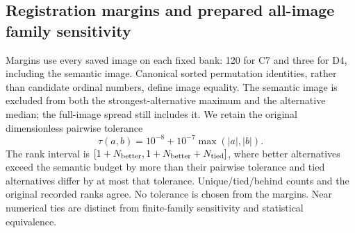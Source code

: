 \begin{table}[p]
\caption{C7 same-bank references and premium endpoints, all \BoundedCellsPerDomain{} fixed cells. $L(I)$ is the identity-action risk, not the loss for the identity group element alone.}
\label{tab:bounded-cell-risk-c7}
\centering\small\setlength{\tabcolsep}{3pt}

\end{table}
\begin{table}[p]
\caption{D4 same-bank references and premium endpoints, all \BoundedCellsPerDomain{} fixed cells. No family or model resampling enters these quantities.}
\label{tab:bounded-cell-risk-d4}
\centering\small\setlength{\tabcolsep}{3pt}

\end{table}
\begin{table}[p]
\caption{C7 total/selected type-energy pairs $e_\tau/b_\tau$. Complete real rotation planes are retained in the budget; total energy and selected energy are distinct.}
\label{tab:bounded-cell-types-c7}
\centering\small\setlength{\tabcolsep}{3pt}

\end{table}
\begin{table}[p]
\caption{D4 total/selected type-energy pairs $e_\tau/b_\tau$. The corner action has only four states; absent types retain their recorded machine-scale values in the CSV, rounded here for display.}
\label{tab:bounded-cell-types-d4}
\centering\small\setlength{\tabcolsep}{3pt}

\end{table}

\FloatBarrier
\subsection{Registration margins and prepared all-image family sensitivity}
\label{app:bounded-margin-details}
Margins use every saved image on each fixed bank: 120 for C7 and three for D4, including the semantic image. Canonical sorted permutation identities, rather than candidate ordinal numbers, define image equality. The semantic image is excluded from both the strongest-alternative maximum and the alternative median; the full-image spread still includes it. We retain the original dimensionless pairwise tolerance
\[
 \tau(a,b)=10^{-8}+10^{-7}\max(|a|,|b|).
\]
The rank interval is $[1+N_{\rm better},1+N_{\rm better}+N_{\rm tied}]$, where better alternatives exceed the semantic budget by more than their pairwise tolerance and tied alternatives differ by at most that tolerance. Unique/tied/behind counts and the original recorded ranks agree. No tolerance is chosen from the margins. Near numerical ties are distinct from finite-family sensitivity and statistical equivalence.

